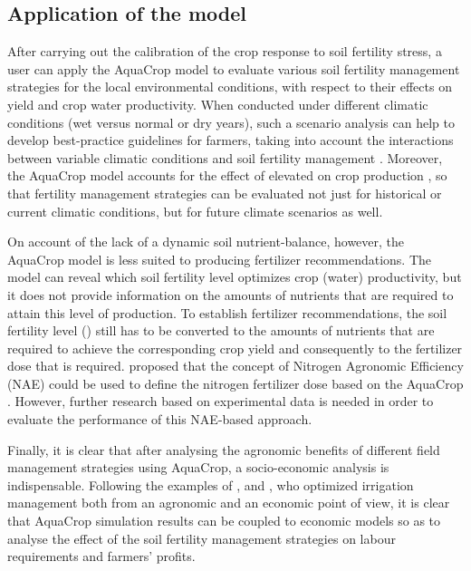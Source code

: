 \subsection{Application of the model}
After carrying out the calibration of the crop response to soil fertility stress, a user can apply the AquaCrop model to evaluate various soil fertility management strategies for the local environmental conditions, with respect to their effects on yield and crop water productivity. When conducted under different climatic conditions (wet versus normal or dry years), such a scenario analysis can help to develop best-practice guidelines for farmers, taking into account the interactions between variable climatic conditions and soil fertility management \parencite{vangaelen2014}. Moreover, the AquaCrop model accounts for the effect of elevated \COtwo on crop production \parencite{vanuytrecht2011}, so that fertility management strategies can be evaluated not just for historical or current climatic conditions, but for future climate scenarios as well. 

On account of the lack of a dynamic soil nutrient-balance, however, the AquaCrop model is less suited to producing fertilizer recommendations. The model can reveal which soil fertility level optimizes crop (water) productivity, but it does not provide information on the amounts of nutrients that are required to attain this level of production. To establish fertilizer recommendations, the soil fertility level (\Brel) still has to be converted to the amounts of nutrients that are required to achieve the corresponding crop yield and consequently to the fertilizer dose that is required. \textcite{oyarmoi2013} proposed that the concept of Nitrogen Agronomic Efficiency (NAE) could be used to define the nitrogen fertilizer dose based on the AquaCrop \Brel. However, further research based on experimental data is needed in order to evaluate the performance of this NAE-based approach. 

Finally, it is clear that after analysing the agronomic benefits of different field management strategies using AquaCrop, a socio-economic analysis is indispensable. Following the examples of \textcite{garciavila2009}, \textcite{garciavila2012} and \textcite{cusicanqui2013}, who optimized irrigation management both from an agronomic and an economic point of view, it is clear that AquaCrop simulation results can be coupled to economic models so as to analyse the effect of the soil fertility management strategies on labour requirements and farmers' profits.

